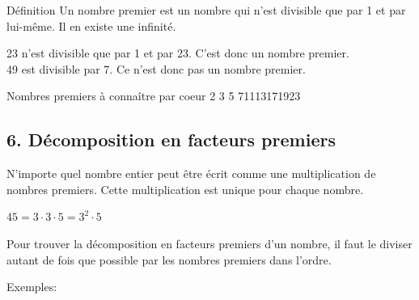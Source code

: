 \begin{regle}{Définition}
Un nombre premier est un nombre qui n'est divisible que par 1 et par lui-même. Il en existe une infinité.
\end{regle}

\begin{center}
23 n'est divisible que par 1 et par 23. C'est donc un nombre premier.\\
49 est divisible par 7. Ce n'est donc pas un nombre premier.
\end{center}

\vspace{20pt}\begin{astuce}{Nombres premiers à connaître par coeur}
\hfill 2 \hfill 3 \hfill 5	 \hfill 7\hfill 11\hfill 13\hfill 17\hfill 19\hfill 23
\end{astuce}

\vfill
\subsection*{6. Décomposition en facteurs premiers}

N'importe quel nombre entier peut être écrit comme une multiplication de nombres premiers. Cette multiplication est unique pour chaque nombre.

\begin{center}
$45=3\cdot 3\cdot 5=3^2\cdot 5$\\
\end{center}

Pour trouver la décomposition en facteurs premiers d'un nombre, il faut le diviser autant de fois que possible par les nombres premiers dans l'ordre.

\vspace{30pt}
Exemples: 

